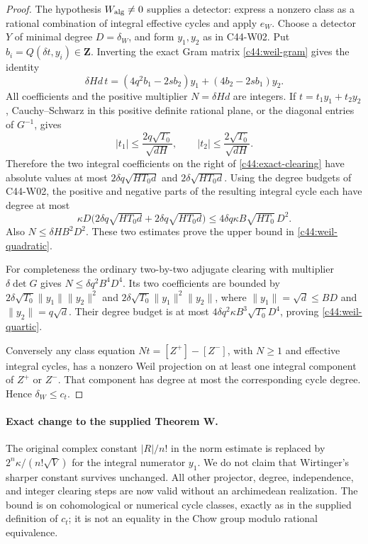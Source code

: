 \begin{proof}
The hypothesis $W_{\rm alg}\ne0$ supplies a detector: express a
nonzero class as a rational combination of integral effective
cycles and apply $e_W$.  Choose a detector $Y$ of minimal degree
$D=\delta_W$, and form $y_1,y_2$ as in C44-W02.  Put
$b_i=Q(\delta t,y_i)\in\mathbf Z$.  Inverting the exact Gram matrix
\eqref{c44:weil-gram} gives the identity
\begin{equation}\label{c44:exact-clearing}
 \delta Hd\,t=(4q^2b_1-2sb_2)y_1+(4b_2-2sb_1)y_2.
\end{equation}
All coefficients and the positive multiplier $N=\delta Hd$ are
integers.  If $t=t_1y_1+t_2y_2$, Cauchy--Schwarz in this
positive definite rational plane, or the diagonal entries of
$G^{-1}$, gives
\[
 |t_1|\leq\frac{2q\sqrt{T_0}}{\sqrt{dH}},\qquad
 |t_2|\leq\frac{2\sqrt{T_0}}{\sqrt{dH}}.
\]
Therefore the two integral coefficients on the right of
\eqref{c44:exact-clearing} have absolute values at most
$2\delta q\sqrt{HT_0d}$ and $2\delta\sqrt{HT_0d}$.
Using the degree budgets of C44-W02, the positive and negative
parts of the resulting integral cycle each have degree at most
\[
 \kappa D\bigl(2\delta q\sqrt{HT_0d}
                     +2\delta q\sqrt{HT_0d}\bigr)
 \leq4\delta q\kappa B\sqrt{HT_0}\,D^2.
\]
Also $N\leq\delta HB^2D^2$.  These two estimates prove the
upper bound in \eqref{c44:weil-quadratic}.

For completeness the ordinary two-by-two adjugate clearing with
multiplier $\delta\det G$ gives
$N\leq\delta q^2B^4D^4$.  Its two coefficients are bounded by
$2\delta\sqrt{T_0}\|y_1\|\|y_2\|^2$ and
$2\delta\sqrt{T_0}\|y_1\|^2\|y_2\|$, where
$\|y_1\|=\sqrt d\leq BD$ and $\|y_2\|=q\sqrt d$.
Their degree budget is at most
$4\delta q^2\kappa B^3\sqrt{T_0}D^4$, proving
\eqref{c44:weil-quartic}.

Conversely any class equation
$Nt=[Z^+]-[Z^-]$, with $N\geq1$ and effective integral cycles,
has a nonzero Weil projection on at least one integral component
of $Z^+$ or $Z^-$.  That component has degree at most the
corresponding cycle degree.  Hence $\delta_W\leq c_t$.
\end{proof}

\paragraph{Exact change to the supplied Theorem W.}
The original complex constant $|R|/n!$ in the norm estimate is
replaced by $2^n\kappa/(n!\sqrt V)$ for the integral numerator
$y_1$.  We do not claim that Wirtinger's sharper constant survives
unchanged.  All other projector, degree, independence, and integer
clearing steps are now valid without an archimedean realization.
The bound is on cohomological or numerical cycle classes, exactly
as in the supplied definition of $c_t$; it is not an equality in
the Chow group modulo rational equivalence.

